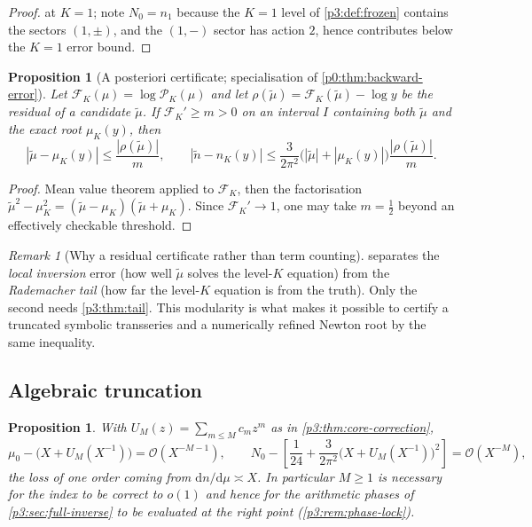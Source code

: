 \documentclass[11pt,a4paper,oneside]{book}
\theoremstyle{plain}
\newtheorem{proposition}[theorem]{Proposition}
\theoremstyle{definition}
\theoremstyle{remark}
\newtheorem{remark}[theorem]{Remark}
\newcommand{\dd}{\mathrm{d}}
\newcommand{\bigO}{\mathcal{O}}
\newcommand{\littleo}{o}
\begin{document}
\begin{proof}
 at $K=1$; note $N_{0}=n_{1}$ because the $K=1$ level of
\cref{p3:def:frozen} contains the sectors $(1,\pm)$, and the $(1,-)$ sector has action $2$, hence
contributes below the $K=1$ error bound.
\end{proof}

\begin{proposition}[A posteriori certificate; specialisation of
\cref{p0:thm:backward-error}]\label{p3:prop:certificate} Let
$\mathcal{F}_{K}(\mu)=\log\mathcal{P}_{K}(\mu)$ and let
$\rho(\widetilde\mu)=\mathcal{F}_{K}(\widetilde\mu)-\log y$ be the residual of a candidate
$\widetilde\mu$. If $\mathcal{F}_{K}'\ge m>0$ on an interval $I$ containing both $\widetilde\mu$
and the exact root $\mu_{K}(y)$, then
\begin{equation}\label{p3:eq:certificate}
 |\widetilde\mu-\mu_{K}(y)|\le\frac{|\rho(\widetilde\mu)|}{m},
 \qquad
 |\widetilde n-n_{K}(y)|\le\frac{3}{2\pi^{2}}
 \bigl(|\widetilde\mu|+|\mu_{K}(y)|\bigr)\frac{|\rho(\widetilde\mu)|}{m}.
\end{equation}
\end{proposition}

\begin{proof}
Mean value theorem applied to $\mathcal{F}_{K}$, then the factorisation
$\widetilde\mu^{2}-\mu_{K}^{2}=(\widetilde\mu-\mu_{K})(\widetilde\mu+\mu_{K})$. Since
$\mathcal{F}_{K}'\to1$, one may take $m=\tfrac12$ beyond an effectively checkable threshold.
\end{proof}

\begin{remark}[Why a residual certificate rather than term counting]
 separates the \emph{local inversion} error (how well $\widetilde\mu$
solves the level-$K$ equation) from the \emph{Rademacher tail} (how far the level-$K$ equation is
from the truth). Only the second needs \cref{p3:thm:tail}. This modularity is what makes it
possible to certify a truncated symbolic transseries and a numerically refined Newton root by the
same inequality.
\end{remark}

\subsection{Algebraic truncation}

\begin{proposition}\label{p3:prop:algebraic-truncation}
With $U_{M}(z)=\sum_{m\le M}c_{m}z^{m}$ as in \cref{p3:thm:core-correction},
\begin{equation}\label{p3:eq:algebraic-truncation}
 \mu_{0}-\bigl(X+U_{M}(X^{-1})\bigr)=\bigO(X^{-M-1}),
 \qquad
 N_{0}-\left[\frac1{24}+\frac3{2\pi^{2}}\bigl(X+U_{M}(X^{-1})\bigr)^{2}\right]
 =\bigO(X^{-M}),
\end{equation}
the loss of one order coming from $\dd n/\dd\mu\asymp X$. In particular $M\ge1$ is
\emph{necessary} for the index to be correct to $\littleo(1)$ and hence for the arithmetic
phases of \cref{p3:sec:full-inverse} to be evaluated at the right point
(\cref{p3:rem:phase-lock}).
\end{proposition}
\end{document}

